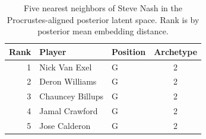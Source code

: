 \begin{table}[htbp]
  \centering\small
  \begin{tabular}{rllc}
    \toprule
    Rank & Player & Position & Archetype \\
    \midrule
    1 & Nick Van Exel & G & 2 \\
    2 & Deron Williams & G & 2 \\
    3 & Chauncey Billups & G & 2 \\
    4 & Jamal Crawford & G & 2 \\
    5 & Jose Calderon & G & 2 \\
    \bottomrule
  \end{tabular}
  \caption{Five nearest neighbors of Steve Nash in the Procrustes-aligned posterior latent space. Rank is by posterior mean embedding distance.}
\end{table}

